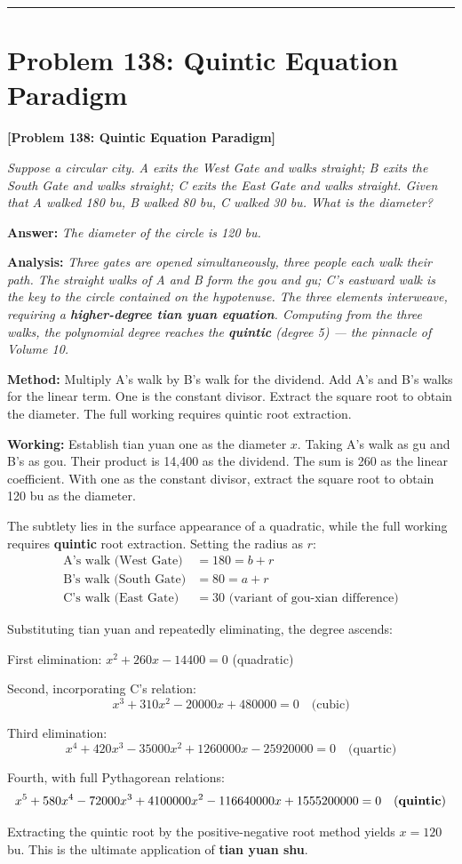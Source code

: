 \documentclass[11pt,a4paper]{book}
\newcommand{\answer}[1]{\noindent\textbf{\color{anacolor}Answer: }\textit{#1}\par}
\newcommand{\method}[1]{\noindent\textbf{\color{methodcolor}Method: }#1\par}
\newcommand{\working}[1]{\noindent\textbf{\color{workcolor}Working: }#1\par}
\newcommand{\analysis}[1]{\noindent\textbf{\color{anacolor}Analysis: }\textit{#1}\par}
\newcommand{\shortline}{\noindent\rule{0.5\textwidth}{0.4pt}\par}
\begin{document}
\shortline

\section{Problem 138: Quintic Equation Paradigm}
\label{sec:prob138}

\noindent\textbf{\color{probcolor}[Problem 138: Quintic Equation Paradigm]}

\textit{Suppose a circular city. A exits the West Gate and walks straight; B exits the South Gate and walks straight; C exits the East Gate and walks straight. Given that A walked 180 bu, B walked 80 bu, C walked 30 bu. What is the diameter?}

\answer{The diameter of the circle is 120 bu.}

\analysis{Three gates are opened simultaneously, three people each walk their path. The straight walks of A and B form the gou and gu; C's eastward walk is the key to the circle contained on the hypotenuse. The three elements interweave, requiring a \textbf{higher-degree tian yuan equation}. Computing from the three walks, the polynomial degree reaches the \textbf{quintic} (degree 5) --- the pinnacle of Volume 10.}

\method{Multiply A's walk by B's walk for the dividend. Add A's and B's walks for the linear term. One is the constant divisor. Extract the square root to obtain the diameter. The full working requires quintic root extraction.}

\working{Establish tian yuan one as the diameter $x$. Taking A's walk as gu and B's as gou. Their product is 14,400 as the dividend. The sum is 260 as the linear coefficient. With one as the constant divisor, extract the square root to obtain 120 bu as the diameter.

The subtlety lies in the surface appearance of a quadratic, while the full working requires \textbf{quintic} root extraction. Setting the radius as $r$:
\begin{align*}
\text{A's walk (West Gate)} &= 180 = b + r \\
\text{B's walk (South Gate)} &= 80 = a + r \\
\text{C's walk (East Gate)} &= 30 \text{ (variant of gou-xian difference)}
\end{align*}

Substituting tian yuan and repeatedly eliminating, the degree ascends:

First elimination: $x^2 + 260x - 14400 = 0$ (quadratic)

Second, incorporating C's relation:
$$x^3 + 310x^2 - 20000x + 480000 = 0 \quad \text{(cubic)}$$

Third elimination:
$$x^4 + 420x^3 - 35000x^2 + 1260000x - 25920000 = 0 \quad \text{(quartic)}$$

Fourth, with full Pythagorean relations:
$$x^5 + 580x^4 - 72000x^3 + 4100000x^2 - 116640000x + 1555200000 = 0 \quad \text{(\textbf{quintic})}$$

Extracting the quintic root by the positive-negative root method yields $x = 120$ bu. This is the ultimate application of \textbf{tian yuan shu}.}
\end{document}
